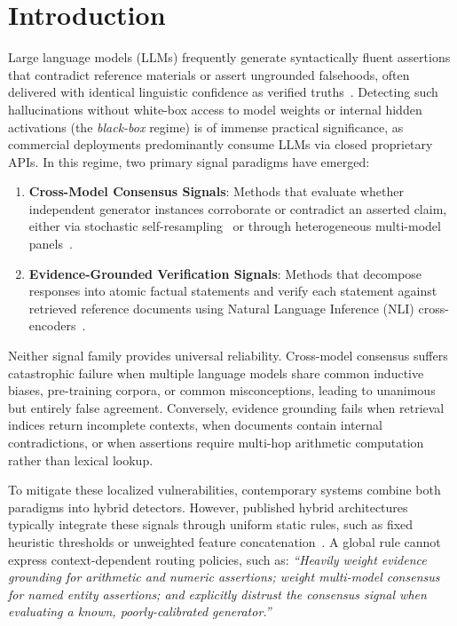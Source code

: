\documentclass[pdflatex,sn-mathphys,Numbered]{sn-jnl}
\begin{document}
\maketitle

\section{Introduction}\label{sec:intro}

Large language models (LLMs) frequently generate syntactically fluent assertions that contradict reference materials or assert ungrounded falsehoods, often delivered with identical linguistic confidence as verified truths~\cite{ji2023survey}. Detecting such hallucinations without white-box access to model weights or internal hidden activations (the \emph{black-box} regime) is of immense practical significance, as commercial deployments predominantly consume LLMs via closed proprietary APIs. In this regime, two primary signal paradigms have emerged:
\begin{enumerate}
    \item \textbf{Cross-Model Consensus Signals}: Methods that evaluate whether independent generator instances corroborate or contradict an asserted claim, either via stochastic self-resampling~\cite{manakul2023selfcheckgpt} or through heterogeneous multi-model panels~\cite{goel2025finchzk}.
    \item \textbf{Evidence-Grounded Verification Signals}: Methods that decompose responses into atomic factual statements and verify each statement against retrieved reference documents using Natural Language Inference (NLI) cross-encoders~\cite{min2023factscore,dhuliawala2023chain}.
\end{enumerate}

Neither signal family provides universal reliability. Cross-model consensus suffers catastrophic failure when multiple language models share common inductive biases, pre-training corpora, or common misconceptions, leading to unanimous but entirely false agreement. Conversely, evidence grounding fails when retrieval indices return incomplete contexts, when documents contain internal contradictions, or when assertions require multi-hop arithmetic computation rather than lexical lookup.

To mitigate these localized vulnerabilities, contemporary systems combine both paradigms into hybrid detectors. However, published hybrid architectures typically integrate these signals through uniform static rules, such as fixed heuristic thresholds or unweighted feature concatenation~\cite{ding2024rowen,zhao2024medico}. A global rule cannot express context-dependent routing policies, such as: \emph{``Heavily weight evidence grounding for arithmetic and numeric assertions; weight multi-model consensus for named entity assertions; and explicitly distrust the consensus signal when evaluating a known, poorly-calibrated generator.''}
\end{document}
